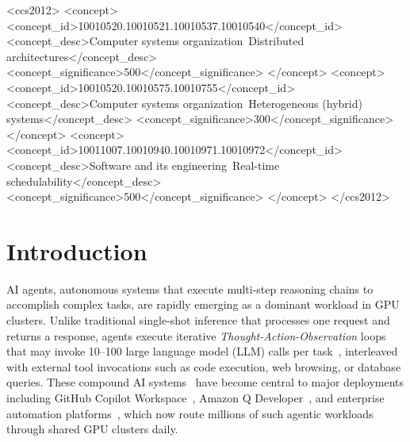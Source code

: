 \documentclass[sigconf]{acmart}
\begin{document}
\begin{CCSXML}
<ccs2012>
 <concept>
  <concept_id>10010520.10010521.10010537.10010540</concept_id>
  <concept_desc>Computer systems organization~Distributed architectures</concept_desc>
  <concept_significance>500</concept_significance>
 </concept>
 <concept>
  <concept_id>10010520.10010575.10010755</concept_id>
  <concept_desc>Computer systems organization~Heterogeneous (hybrid) systems</concept_desc>
  <concept_significance>300</concept_significance>
 </concept>
 <concept>
  <concept_id>10011007.10010940.10010971.10010972</concept_id>
  <concept_desc>Software and its engineering~Real-time schedulability</concept_desc>
  <concept_significance>500</concept_significance>
 </concept>
</ccs2012>
\end{CCSXML}



\maketitle

\section{Introduction}
\label{sec:intro}

AI agents, autonomous systems that execute multi-step reasoning chains to accomplish complex tasks, are rapidly emerging as a dominant workload in GPU clusters. Unlike traditional single-shot inference that processes one request and returns a response, agents execute iterative \emph{Thought-Action-Observation} loops~\cite{yao2023react} that may invoke 10--100 large language model (LLM) calls per task~\cite{jimenez2024swebench}, interleaved with external tool invocations such as code execution, web browsing, or database queries. These compound AI systems~\cite{zaharia2024compound} have become central to major deployments including GitHub Copilot Workspace~\cite{github2024copilot}, Amazon Q Developer~\cite{amazon2024q}, and enterprise automation platforms~\cite{langchain2024,crewai2023}, which now route millions of such agentic workloads through shared GPU clusters daily.
\end{document}
